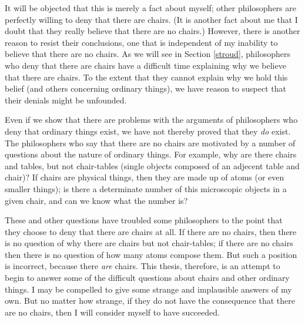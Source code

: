 \documentclass[11pt]{article}
\begin{document}
\begin{spacing}{1.25}
It will be objected that this is merely a fact about myself; other
philosophers are perfectly willing to deny that there are chairs.  (It
is another fact about me that I doubt that they really believe that
there are no chairs.)  However, there is another reason to resist
their conclusions, one that is independent of my inability to believe
that there are no chairs.  As we will see in Section \ref{stroud},
philosophers who deny that there are chairs have a difficult time
explaining why we believe that there are chairs.  To the extent that
they cannot explain why we hold this belief (and others concerning
ordinary things), we have reason to suspect that their denials might
be unfounded.

Even if we show that there are problems with the arguments of
philosophers who deny that ordinary things exist, we have not thereby
proved that they {\em do} exist.  The philosophers who say that there
are no chairs are motivated by a number of questions about the nature
of ordinary things.  For example, why are there chairs and tables, but
not chair-tables (single objects composed of an adjecent table and
chair)?  If chairs are physical things, then they are made up of atoms
(or even smaller things); is there a determinate number of this
microscopic objects in a given chair, and can we know what the number
is?

These and other questions have troubled some philosophers to the point
that they choose to deny that there are chairs at all.  If there are
no chairs, then there is no question of why there are chairs but not
chair-tables; if there are no chairs then there is no question of how
many atoms compose them.  But such a position is incorrect, because
there {\em are} chairs.  This thesis, therefore, is an attempt to
begin to answer some of the difficult questions about chairs and other
ordinary things.  I may be compelled to give some strange and
implausible answers of my own.  But no matter how strange, if they do
not have the consequence that there are no chairs, then I will
consider myself to have succeeded.

\ifstandalone
\end{spacing}


\fi
\end{document}
